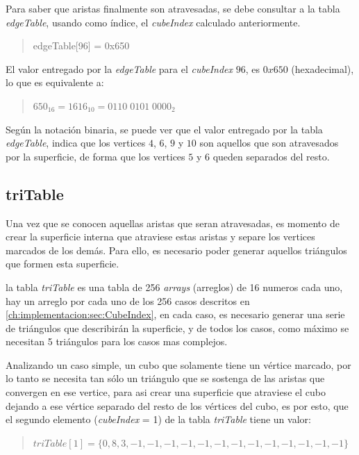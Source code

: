 Para saber que aristas finalmente son atravesadas, se debe consultar a la tabla \emph{edgeTable}, usando como índice, el \emph{cubeIndex} calculado anteriormente.

\begin{quote}
	edgeTable[96] = 0x650
\end{quote}

El valor entregado por la \emph{edgeTable} para el \emph{cubeIndex} $96$, es $0x650$ (hexadecimal), lo que es equivalente a:

\begin{quote}
	$650_{16} = 1616_{10} = 0110 \; 0101 \; 0000_{2}$
\end{quote}

Según la notación binaria, se puede ver que el valor entregado por la tabla \emph{edgeTable}, indica que los vertices $4$, $6$, $9$ y $10$ son aquellos que son atravesados por la superficie, de forma que los vertices $5$ y $6$ queden separados del resto.

\subsection{triTable}
\label{ch:implementacion:sec:triTable}

Una vez que se conocen aquellas aristas que seran atravesadas, es momento de crear la superficie interna que atraviese estas aristas y separe los vertices marcados de los demás. Para ello, es necesario poder generar aquellos triángulos que formen esta superficie.

la tabla \emph{triTable} es una tabla de 256 \emph{arrays} (arreglos) de 16 numeros cada uno, hay un arreglo por cada uno de los 256 casos descritos en \ref{ch:implementacion:sec:CubeIndex}, en cada caso, es necesario generar una serie de triángulos que describirán la superficie, y de todos los casos, como máximo se necesitan 5 triángulos para los casos mas complejos.

Analizando un caso simple, un cubo que solamente tiene un vértice marcado, por lo tanto se necesita tan sólo un triángulo que se sostenga de las aristas que convergen en ese vertice, para asi crear una superficie que atraviese el cubo dejando a ese vértice separado del resto de los vértices del cubo, es por esto, que el segundo elemento (\emph{cubeIndex} = 1) de la tabla \emph{triTable} tiene un valor:

\begin{quote}
	$triTable[1] = \{0, 8, 3, -1, -1, -1, -1, -1, -1, -1, -1, -1, -1, -1, -1, -1\}$
\end{quote}

